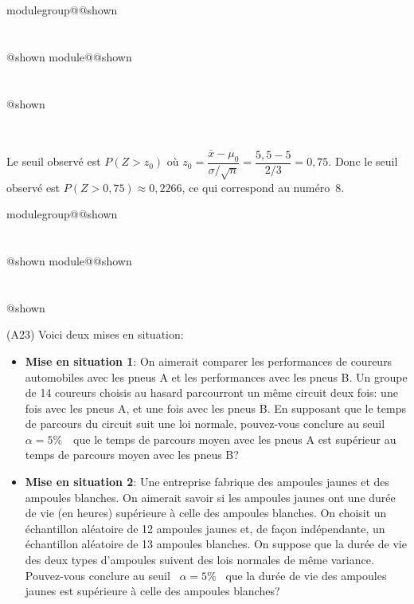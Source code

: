 \documentclass{Evaluation}
\makeatletter
\newcommand{\currentmodulekey}{}
\newcommand{\currentmoduletitle}{}
\newcommand{\currentgroupkey}{}
\newcommand{\currentgrouptitle}{}
\newcommand{\showmoduleifneeded}{%
  \ifx\currentgroupkey\empty\else
    \expandafter\ifx\csname modulegroup@\currentgroupkey @shown\endcsname\relax
      \section*{\currentgrouptitle}%
      \expandafter\gdef\csname modulegroup@\currentgroupkey @shown\endcsname{1}%
    \fi
  \fi
  \expandafter\ifx\csname module@\currentmodulekey @shown\endcsname\relax
    \section*{\currentmoduletitle}%
    \expandafter\gdef\csname module@\currentmodulekey @shown\endcsname{1}%
  \fi
}
\newenvironment{A23}{\showmoduleifneeded}{}
\makeatother
\begin{document}
\begin{questions}
\begin{A23}
\begin{parts}
  \begin{oneparcheckboxes}
      \hspace{0.061cm}
      \hspace{0.061cm}
      \hspace{0.061cm}
      \hspace{0.061cm}
      \hspace{0.061cm}
      \hspace{0.061cm}
      \\
 \end{oneparcheckboxes}

\begin{solution}
Le seuil observé est $P(Z > z_0)$ où $z_0 = \dfrac{\bar{x} - \mu_0}{\sigma/\sqrt{n}} = \dfrac{5{,}5 - 5}{2/3} = 0{,}75$. Donc le seuil observé est $P(Z > 0{,}75) \approx 0{,}2266$, ce qui correspond au numéro~8.
\end{solution}
 

\end{parts}
\end{A23}

\begin{A23}
\question
(A23)
Voici deux mises en situation:
\begin{itemize}
    \item {\bf Mise en situation 1}: On aimerait comparer les performances de coureurs automobiles avec les pneus A et les performances avec les pneus B. Un groupe de 14 coureurs choisis au hasard parcourront un même circuit deux fois: une fois avec les pneus A, et une fois avec les pneus B. En supposant que le temps de parcours du circuit suit une loi normale, pouvez-vous conclure au seuil  $\alpha=5\%$  que le temps de parcours moyen avec les pneus A est supérieur au temps de parcours moyen avec les pneus B?
    \item {\bf Mise en situation 2}: Une entreprise fabrique des ampoules jaunes et des ampoules blanches. On aimerait savoir si les ampoules jaunes ont une durée de vie (en heures) supérieure à celle des ampoules blanches. On choisit un échantillon aléatoire de 12 ampoules jaunes et, de façon indépendante, un échantillon aléatoire de 13 ampoules blanches. On suppose que la durée de vie des deux types d'ampoules suivent des lois normales de même variance. Pouvez-vous conclure au seuil  $\alpha=5\%$  que la durée de vie des ampoules jaunes est supérieure à celle des ampoules blanches?
\end{itemize}


\end{A23}
\end{questions}
\end{document}
